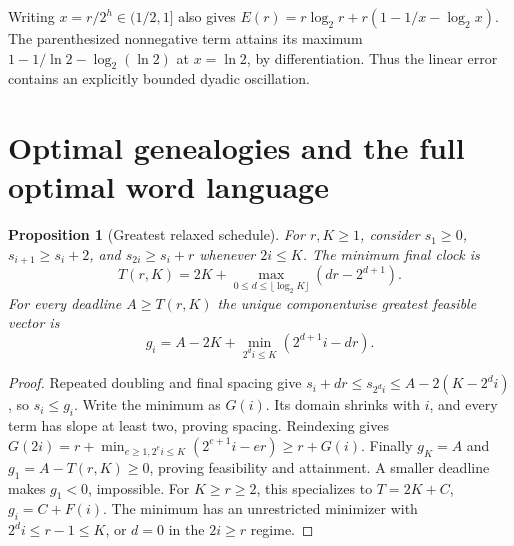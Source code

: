 \documentclass[11pt]{article}
\newtheorem{proposition}[theorem]{Proposition}
\begin{document}
Writing $x=r/2^h\in(1/2,1]$ also gives
$E(r)=r\log_2r+r(1-1/x-\log_2x)$.
The parenthesized nonnegative term attains its maximum
$1-1/\ln2-\log_2(\ln2)$ at $x=\ln2$, by differentiation. Thus the
linear error contains an explicitly bounded dyadic oscillation.

\section{Optimal genealogies and the full optimal word language}
\begin{proposition}[Greatest relaxed schedule]
For $r,K\ge1$, consider $s_1\ge0$, $s_{i+1}\ge s_i+2$, and
$s_{2i}\ge s_i+r$ whenever $2i\le K$. The minimum final clock is
\[
T(r,K)=2K+\max_{0\le d\le\lfloor\log_2K\rfloor}(dr-2^{d+1}).
\]
For every deadline $A\ge T(r,K)$ the unique componentwise greatest
feasible vector is
\[
g_i=A-2K+\min_{2^di\le K}(2^{d+1}i-dr).
\]
\end{proposition}
\begin{proof}
Repeated doubling and final spacing give
$s_i+dr\le s_{2^di}\le A-2(K-2^di)$, so $s_i\le g_i$.
Write the minimum as $G(i)$. Its domain shrinks with $i$, and every term
has slope at least two, proving spacing. Reindexing gives
$G(2i)=r+\min_{e\ge1,2^ei\le K}(2^{e+1}i-er)\ge r+G(i)$.
Finally $g_K=A$ and $g_1=A-T(r,K)\ge0$, proving feasibility and
attainment. A smaller deadline makes $g_1<0$, impossible.
For $K\ge r\ge2$, this specializes to $T=2K+C$, $g_i=C+F(i)$.
The minimum has an unrestricted minimizer with $2^di\le r-1\le K$,
or $d=0$ in the $2i\ge r$ regime.
\end{proof}
\end{document}
